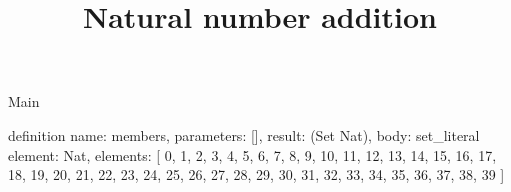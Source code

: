 \begin{lexlean}{Main}
\title{Natural number addition}
\begin{semanticmodule}
definition{
  name: members,
  parameters: [],
  result: (Set Nat),
  body: set_literal{
    element: Nat,
    elements: [
      0,
      1,
      2,
      3,
      4,
      5,
      6,
      7,
      8,
      9,
      10,
      11,
      12,
      13,
      14,
      15,
      16,
      17,
      18,
      19,
      20,
      21,
      22,
      23,
      24,
      25,
      26,
      27,
      28,
      29,
      30,
      31,
      32,
      33,
      34,
      35,
      36,
      37,
      38,
      39
    ]
  }
}
\end{semanticmodule}
\end{lexlean}
